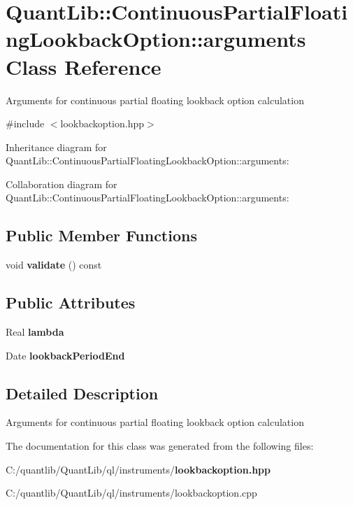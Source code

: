 \section{Quant\+Lib\+:\+:Continuous\+Partial\+Floating\+Lookback\+Option\+:\+:arguments Class Reference}
\label{class_quant_lib_1_1_continuous_partial_floating_lookback_option_1_1arguments}


Arguments for continuous partial floating lookback option calculation  




{\ttfamily \#include $<$lookbackoption.\+hpp$>$}



Inheritance diagram for Quant\+Lib\+:\+:Continuous\+Partial\+Floating\+Lookback\+Option\+:\+:arguments\+:


Collaboration diagram for Quant\+Lib\+:\+:Continuous\+Partial\+Floating\+Lookback\+Option\+:\+:arguments\+:
\subsection*{Public Member Functions}
\begin{DoxyCompactItemize}
\item 
void {\bfseries validate} () const \label{class_quant_lib_1_1_continuous_partial_floating_lookback_option_1_1arguments_a371895b16218cfd01968bad68a678e39}

\end{DoxyCompactItemize}
\subsection*{Public Attributes}
\begin{DoxyCompactItemize}
\item 
Real {\bfseries lambda}\label{class_quant_lib_1_1_continuous_partial_floating_lookback_option_1_1arguments_aacb945e8363f9e989be000c71cf76005}

\item 
Date {\bfseries lookback\+Period\+End}\label{class_quant_lib_1_1_continuous_partial_floating_lookback_option_1_1arguments_ade46713cf75f9d231ab0a5262a4db76e}

\end{DoxyCompactItemize}


\subsection{Detailed Description}
Arguments for continuous partial floating lookback option calculation 

The documentation for this class was generated from the following files\+:\begin{DoxyCompactItemize}
\item 
C\+:/quantlib/\+Quant\+Lib/ql/instruments/{\bf lookbackoption.\+hpp}\item 
C\+:/quantlib/\+Quant\+Lib/ql/instruments/lookbackoption.\+cpp\end{DoxyCompactItemize}
